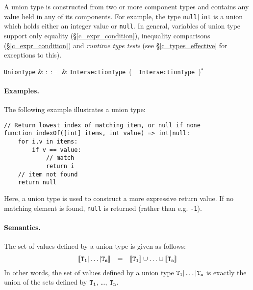 A union type is constructed from two or more component types and contains any value held in any of its components.  For example, the type \lstinline{null|int} is a union which holds either an integer value or \lstinline{null}.  In general, variables of union type support only equality (\S\ref{c_expr_condition}), inequality comparisons (\S\ref{c_expr_condition}) and {\em runtime type tests} (see \S\ref{c_types_effective} for exceptions to this).

\begin{syntax}
  \verb+UnionType+ & $::=$ & \verb+IntersectionType+\ \big(\ \token{|}\ \verb+IntersectionType+\
  \big)$^*$\\
\end{syntax}

\paragraph{Examples.}  The following example illustrates a union type:

\begin{lstlisting}
// Return lowest index of matching item, or null if none
function indexOf([int] items, int value) => int|null:
    for i,v in items:
        if v == value:
            // match
            return i
    // item not found
    return null
\end{lstlisting}

Here, a union type is used to construct a more expressive return value.  If no matching element is found, \lstinline{null} is returned (rather than e.g. \lstinline{-1}).

\paragraph{Semantics.}  The set of values defined by a union type is given as follows:
\begin{displaymath}
\begin{array}{rcl}
{\tt\llbracket T_1|\ldots|T_n\rrbracket} & = & {\tt \llbracket T_1\rrbracket\cup\ldots\cup \llbracket T_n\rrbracket}\\
\end{array}
\end{displaymath}
In other words, the set of values defined by a union type ${\tt T_1|\ldots|T_n}$ is exactly the union of the sets defined by ${\tt T_1}$, \ldots, ${\tt T_n}$.


